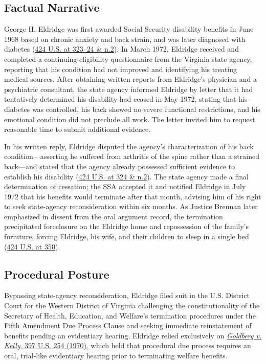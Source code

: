\documentclass[12pt]{article}
\begin{document}
\subsection{Factual Narrative}
George H. Eldridge was first awarded Social Security disability benefits in June 1968 based on chronic anxiety and back strain, and was later diagnosed with diabetes (\href{https://supreme.justia.com/cases/federal/us/424/319/}{424 U.S. at 323--24 \& n.2}). In March 1972, Eldridge received and completed a continuing-eligibility questionnaire from the Virginia state agency, reporting that his condition had not improved and identifying his treating medical sources. After obtaining written reports from Eldridge's physician and a psychiatric consultant, the state agency informed Eldridge by letter that it had tentatively determined his disability had ceased in May 1972, stating that his diabetes was controlled, his back showed no severe functional restrictions, and his emotional condition did not preclude all work. The letter invited him to request reasonable time to submit additional evidence.

In his written reply, Eldridge disputed the agency's characterization of his back condition---asserting he suffered from arthritis of the spine rather than a strained back---and stated that the agency already possessed sufficient evidence to establish his disability (\href{https://supreme.justia.com/cases/federal/us/424/319/}{424 U.S. at 324 \& n.2}). The state agency made a final determination of cessation; the SSA accepted it and notified Eldridge in July 1972 that his benefits would terminate after that month, advising him of his right to seek state-agency reconsideration within six months. As Justice Brennan later emphasized in dissent from the oral argument record, the termination precipitated foreclosure on the Eldridge home and repossession of the family's furniture, forcing Eldridge, his wife, and their children to sleep in a single bed (\href{https://supreme.justia.com/cases/federal/us/424/319/}{424 U.S. at 350}).

\subsection{Procedural Posture}
Bypassing state-agency reconsideration, Eldridge filed suit in the U.S. District Court for the Western District of Virginia challenging the constitutionality of the Secretary of Health, Education, and Welfare's termination procedures under the Fifth Amendment Due Process Clause and seeking immediate reinstatement of benefits pending an evidentiary hearing. Eldridge relied exclusively on \href{https://supreme.justia.com/cases/federal/us/397/254/}{\emph{Goldberg v. Kelly}, 397 U.S. 254 (1970)}, which held that procedural due process requires an oral, trial-like evidentiary hearing prior to terminating welfare benefits.
\end{document}
